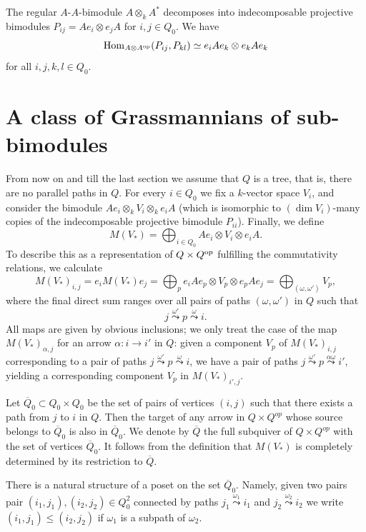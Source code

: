 \documentclass[12pt,a4paper]{amsart}
\numberwithin{equation}{section}
\theoremstyle{remark}
\begin{document}
The regular $A$-$A$-bimodule $A\otimes_kA^*$ decomposes into indecomposable projective bimodules 
$P_{ij}=Ae_i\otimes e_jA$ for $i,j\in Q_0$. We have
$${\rm Hom}_{A\otimes A^{\rm op}}(P_{ij},P_{kl})\simeq e_iAe_k\otimes e_kAe_k$$
for all $i,j,k,l\in Q_0$.

\section{A class of Grassmannians of sub-bimodules}\label{sec:sub-bimodules}
From now on and till the last section we assume that $Q$ is a tree, that is, there are no parallel paths 
in $Q$. For every $i\in Q_0$ we fix a $k$-vector space $V_i$, and consider the bimodule
$Ae_i\otimes_kV_i\otimes_ke_iA$ (which is isomorphic to $(\dim V_i)$-many copies of the indecomposable
projective bimodule $P_{ii}$). 
Finally, we define
\begin{equation}
M(V_*)=\bigoplus_{i\in Q_0}Ae_i\otimes V_i\otimes e_iA.
\end{equation}
To describe this as a representation of $Q\times Q^{\rm op}$ fulfilling the commutativity relations, 
we calculate
$$M(V_*)_{i,j}=e_iM(V_*)e_j=\bigoplus_pe_iAe_p\otimes V_p\otimes e_pAe_j=\bigoplus_{(\omega,\omega')}V_p,$$
where the final direct sum ranges over all pairs of paths $(\omega,\omega')$ in $Q$ such that
$$j\stackrel{\omega'}{\leadsto}p\stackrel{\omega}{\leadsto}i.$$
All maps are given by obvious inclusions; we only treat the case of the map $M(V_*)_{\alpha,j}$ for 
an arrow $\alpha:i\rightarrow i'$ in $Q$: 
given a component $V_p$ of $M(V_*)_{i,j}$ corresponding to a pair of paths 
$j\stackrel{\omega'}{\leadsto}p\stackrel{\omega}{\leadsto}i$, we have a pair of paths 
$j\stackrel{\omega'}{\leadsto}p\stackrel{\alpha\omega}{\leadsto}i'$, yielding a corresponding 
component $V_p$ in $M(V_*)_{i',j}$.

Let $\overline Q_0\subset Q_0\times Q_0$ be the set of pairs of vertices $(i,j)$ such that there exists a path from 
$j$ to $i$ in $Q$. Then the target of  any arrow in $Q\times Q^{op}$ whose source
belongs to $\overline Q_0$ is also in $\overline Q_0$. We denote by $\overline Q$ the full subquiver
of $Q\times Q^{op}$ with the set of vertices $\overline Q_0$. It follows from the 
definition that $M(V_*)$ is completely determined by its restriction to 
$\overline Q$.

There is a natural structure of a poset on the set $\overline Q_0$. Namely, given
two pairs pair $(i_1,j_1),(i_2,j_2)\in Q_0^2$ connected by  paths $j_1\stackrel{\omega_1}{\leadsto}i_1$ and $j_2\stackrel{\omega_2}{\leadsto}i_2$ 
we write $(i_1,j_1)\le (i_2,j_2)$ if $\omega_1$ is a subpath of $\omega_2$.
\end{document}
